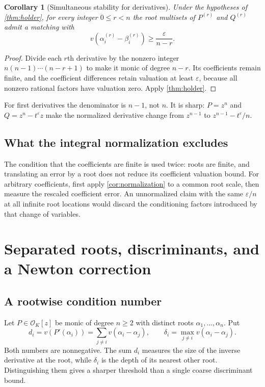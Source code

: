 \documentclass[11pt,letterpaper]{article}
\numberwithin{equation}{section}
\newtheorem{corollary}[theorem]{Corollary}
\theoremstyle{definition}
\theoremstyle{remark}\newtheorem{remark}[theorem]{Remark}
\newcommand{\OO}{\mathcal O}
\begin{document}
\begin{corollary}[Simultaneous stability for derivatives]\label{cor:derivativeholder}
Under the hypotheses of \cref{thm:holder}, for every integer $0\le r<n$
the root multisets of $P^{(r)}$ and $Q^{(r)}$ admit a matching with
\[
 v(\alpha_i^{(r)}-\beta_i^{(r)})\ge\frac{\varepsilon}{n-r}.
\]
\end{corollary}
\begin{proof}
Divide each $r$th derivative by the nonzero integer
$n(n-1)\cdots(n-r+1)$ to make it monic of degree $n-r$.
Its coefficients remain finite, and the coefficient differences retain
valuation at least $\varepsilon$, because all nonzero rational factors
have valuation zero. Apply \cref{thm:holder}.
\end{proof}
For first derivatives the denominator is $n-1$, not $n$. It is sharp:
$P=z^n$ and $Q=z^n-t^\varepsilon z$ make the normalized derivative
change from $z^{n-1}$ to $z^{n-1}-t^\varepsilon/n$.

\subsection{What the integral normalization excludes}
The condition that the coefficients are finite is used twice: roots
are finite, and translating an error by a root does not reduce its
coefficient valuation bound. For arbitrary coefficients, first apply
\cref{cor:normalization} to a common root scale, then measure the
rescaled coefficient error. An unnormalized claim with the same
$\varepsilon/n$ at all infinite root locations would discard the
conditioning factors introduced by that change of variables.

\section{Separated roots, discriminants, and a Newton correction}
\label{sec:separated}

\subsection{A rootwise condition number}
Let $P\in\OO_K[z]$ be monic of degree $n\ge2$ with distinct roots
$\alpha_1,\ldots,\alpha_n$. Put
\begin{equation}\label{eq:di}
 d_i=v(P'(\alpha_i))=\sum_{j\ne i}v(\alpha_i-\alpha_j),\qquad
 \delta_i=\max_{j\ne i}v(\alpha_i-\alpha_j).
\end{equation}
Both numbers are nonnegative. The sum $d_i$ measures the size of the
inverse derivative at the root, while $\delta_i$ is the depth of its
nearest other root. Distinguishing them gives a sharper threshold than
a single coarse discriminant bound.
\end{document}
